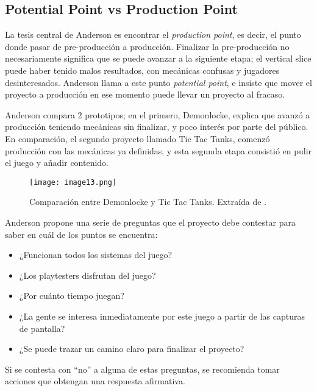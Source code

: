 \subsection{Potential Point vs Production Point}
\par La tesis central de Anderson es encontrar el \textit{production point}, es decir, el punto donde pasar de pre-producción a producción. Finalizar la pre-producción no necesariamente significa que se puede avanzar a la siguiente etapa; el vertical slice puede haber tenido malos resultados, con mecánicas confusas y jugadores desinteresados. Anderson llama a este punto \textit{potential point}, e insiste que mover el proyecto a producción en ese momento puede llevar un proyecto al fracaso.
\par Anderson compara 2 prototipos; en el primero, Demonlocke, explica que avanzó a producción teniendo mecánicas sin finalizar, y poco interés por parte del público. En comparación, el segundo proyecto llamado Tic Tac Tanks, comenzó producción con las mecánicas ya definidas, y esta segunda etapa consistió en pulir el juego y añadir contenido.
\begin{figure}[H]
  \centering
  \texttt{[image: image13.png]}
  \caption{Comparación entre Demonlocke y Tic Tac Tanks. Extraída de \cite{andersonProductionPointHow2023}.}
  \label{fig:x Demonlocke vs tic tac tanks}
\end{figure}
\par Anderson propone una serie de preguntas que el proyecto debe contestar para saber en cuál de los puntos se encuentra:
\begin{itemize}
  \item ¿Funcionan todos los sistemas del juego?
  \item ¿Los playtesters disfrutan del juego?
  \item ¿Por cuánto tiempo juegan?
  \item ¿La gente se interesa inmediatamente por este juego a partir de las capturas de pantalla?
  \item ¿Se puede trazar un camino claro para finalizar el proyecto?
\end{itemize}
\par Si se contesta con “no” a alguna de estas preguntas, se recomienda tomar acciones que obtengan una respuesta afirmativa.
%
%
